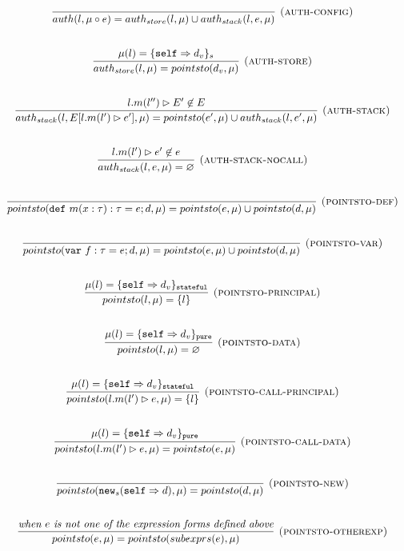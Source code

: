 \documentclass{llncs}
\newcommand{\keywadj}[1]{\mathtt{#1}}
\newcommand{\keyw}[1]{\keywadj{#1}~}
\begin{document}
\[
\begin{array}{c}
\infer[\textsc{(auth-config)}]
  {auth(l,\mu \circ e) = auth_{store}(l,\mu) \cup auth_{stack}(l,e,\mu)}
  {}\\[5ex]

\infer[\textsc{(auth-store)}]
  {auth_{store}(l,\mu) = pointsto(d_v,\mu)}
  {\mu(l) = \{ \keywadj{self} \Rightarrow d_v \}_{s}}\\[5ex]
  
\infer[\textsc{(auth-stack)}]
  {auth_{stack}(l,E[l.m(l') \rhd e'],\mu) = pointsto(e',\mu) \cup auth_{stack}(l,e',\mu)}
  {l.m(l'') \rhd E' \not\in E}\\[5ex]
  
\infer[\textsc{(auth-stack-nocall)}]
  {auth_{stack}(l,e,\mu) = \varnothing}
  {l.m(l') \rhd e' \not\in e}\\[5ex]
  
\infer[\textsc{(pointsto-def)}]
  {pointsto(\keyw{def} m(x:\tau):\tau = e; d,\mu) = pointsto(e,\mu) \cup pointsto(d,\mu)}
  {}\\[5ex]
  
\infer[\textsc{(pointsto-var)}]
  {pointsto(\keyw{var} f:\tau = e; d,\mu) = pointsto(e,\mu) \cup pointsto(d,\mu)}
  {}\\[5ex]
  
\infer[\textsc{(pointsto-principal)}]
  {pointsto(l,\mu) = \{ l \}}
  {\mu(l) = \{ \keywadj{self} \Rightarrow d_v \}_\keywadj{stateful}}\\[5ex]
  
\infer[\textsc{(pointsto-data)}]
  {pointsto(l,\mu) = \varnothing }
  {\mu(l) = \{ \keywadj{self} \Rightarrow d_v \}_\keywadj{pure}}\\[5ex]

\infer[\textsc{(pointsto-call-principal)}]
  {pointsto(l.m(l') \rhd e,\mu) = \{l\} }
  {\mu(l) = \{ \keywadj{self} \Rightarrow d_v \}_\keywadj{stateful}}\\[5ex]
  
\infer[\textsc{(pointsto-call-data)}]
  {pointsto(l.m(l') \rhd e,\mu) = pointsto(e,\mu)}
  {\mu(l) = \{ \keywadj{self} \Rightarrow d_v \}_\keywadj{pure}}\\[5ex]
  
\infer[\textsc{(pointsto-new)}]
  {pointsto(\keywadj{new}_{s}(\keywadj{self} \Rightarrow d),\mu) = pointsto(d,\mu) }
  {}\\[5ex]
  
\infer[\textsc{(pointsto-otherexp)}]
  {pointsto(e,\mu) = pointsto(subexprs(e),\mu) }
  {\textit{when $e$ is not one of the expression forms defined above}}\\[5ex]

\end{array}
\]
\end{document}

